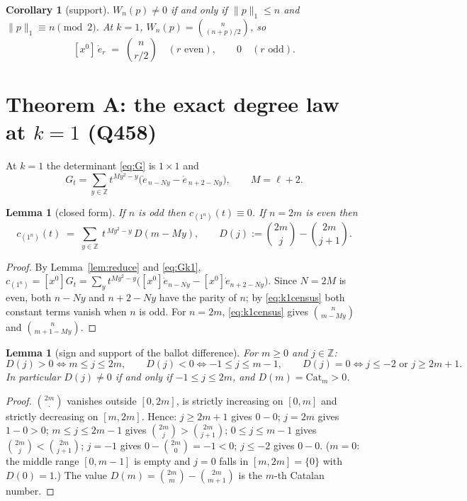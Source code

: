 \documentclass[11pt]{article}
\theoremstyle{plain}
\newtheorem{lemma}[theorem]{Lemma}
\newtheorem{corollary}[theorem]{Corollary}
\theoremstyle{definition}
\theoremstyle{remark}
\newcommand{\Z}{\mathbb{Z}}
\newcommand{\edot}{\dot{e}}
\newcommand{\onen}{(1^{n})}
\begin{document}
\begin{corollary}[support]\label{cor:support}
$W_n(p)\neq0$ if and only if $\|p\|_1\le n$ and $\|p\|_1\equiv n\pmod 2$.
At $k=1$, $W_n(p)=\binom{n}{(n+p)/2}$, so
\begin{equation}\label{eq:k1census}
  [x^{0}]\,\edot_r \;=\; \binom{n}{r/2}\quad(r\text{ even}),\qquad 0\quad(r\text{ odd}).
\end{equation}
\end{corollary}

\section{Theorem A: the exact degree law at $k=1$ (Q458)}\label{sec:k1}

At $k=1$ the determinant \eqref{eq:G} is $1\times1$ and
\begin{equation}\label{eq:Gk1}
  G_t=\sum_{y\in\Z}t^{My^2-y}\bigl(\edot_{\,n-Ny}-\edot_{\,n+2-Ny}\bigr),\qquad M=\ell+2 .
\end{equation}

\begin{lemma}[closed form]\label{lem:k1closed}
If $n$ is odd then $c_\onen(t)\equiv0$. If $n=2m$ is even then
\begin{equation}\label{eq:k1form}
  c_\onen(t)\;=\;\sum_{y\in\Z}\ t^{\,My^2-y}\,D(m-My),
  \qquad D(j):=\binom{2m}{j}-\binom{2m}{j+1}.
\end{equation}
\end{lemma}

\begin{proof}
By Lemma~\ref{lem:reduce} and \eqref{eq:Gk1}, $c_\onen=[x^0]G_t
=\sum_y t^{My^2-y}\bigl([x^0]\edot_{n-Ny}-[x^0]\edot_{n+2-Ny}\bigr)$.
Since $N=2M$ is even, both $n-Ny$ and $n+2-Ny$ have the parity of $n$; by
\eqref{eq:k1census} both constant terms vanish when $n$ is odd. For $n=2m$,
\eqref{eq:k1census} gives $\binom{n}{m-My}$ and $\binom{n}{m+1-My}$.
\end{proof}

\begin{lemma}[sign and support of the ballot difference]\label{lem:D}
For $m\ge0$ and $j\in\Z$:
\[
  D(j)>0 \iff m\le j\le 2m,\qquad
  D(j)<0 \iff -1\le j\le m-1,\qquad
  D(j)=0 \iff j\le-2 \text{ or } j\ge 2m+1 .
\]
In particular $D(j)\ne0$ if and only if $-1\le j\le 2m$, and $D(m)=\mathrm{Cat}_m>0$.
\end{lemma}

\begin{proof}
$\binom{2m}{\cdot}$ vanishes outside $[0,2m]$, is strictly increasing on $[0,m]$ and
strictly decreasing on $[m,2m]$. Hence: $j\ge2m+1$ gives $0-0$; $j=2m$ gives $1-0>0$;
$m\le j\le 2m-1$ gives $\binom{2m}{j}>\binom{2m}{j+1}$; $0\le j\le m-1$ gives
$\binom{2m}{j}<\binom{2m}{j+1}$; $j=-1$ gives $0-\binom{2m}{0}=-1<0$; $j\le-2$ gives
$0-0$. ($m=0$: the middle range $[0,m-1]$ is empty and $j=0$ falls in $[m,2m]=\{0\}$ with
$D(0)=1$.) The value $D(m)=\binom{2m}{m}-\binom{2m}{m+1}$ is the $m$-th Catalan number.
\end{proof}
\end{document}
